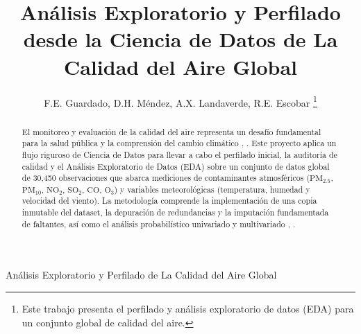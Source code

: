 \documentclass[journal,twocolumn,spanish]{IEEEtran}
\begin{document}
\title{Análisis Exploratorio y Perfilado desde la Ciencia de Datos de La Calidad del Aire Global}

\author{F.E. Guardado, D.H. Méndez, A.X. Landaverde, R.E. Escobar%
\thanks{Este trabajo presenta el perfilado y análisis exploratorio de datos (EDA) para un conjunto global de calidad del aire.}}

%
{Análisis Exploratorio y Perfilado de La Calidad del Aire Global}

\maketitle

\begin{abstract}
El monitoreo y evaluación de la calidad del aire representa un desafío fundamental para la salud pública y la comprensión del cambio climático \cite{OMS2021}, \cite{Rivas2022}. Este proyecto aplica un flujo riguroso de Ciencia de Datos para llevar a cabo el perfilado inicial, la auditoría de calidad y el Análisis Exploratorio de Datos (EDA) sobre un conjunto de datos global de 30,450 observaciones que abarca mediciones de contaminantes atmosféricos ($\text{PM}_{2.5}$, $\text{PM}_{10}$, $\text{NO}_2$, $\text{SO}_2$, $\text{CO}$, $\text{O}_3$) y variables meteorológicas (temperatura, humedad y velocidad del viento). La metodología comprende la implementación de una copia inmutable del dataset, la depuración de redundancias y la imputación fundamentada de faltantes, así como el análisis probabilístico univariado y multivariado \cite{Tukey1977}, \cite{Wickham2014}.


\end{abstract}
\end{document}
